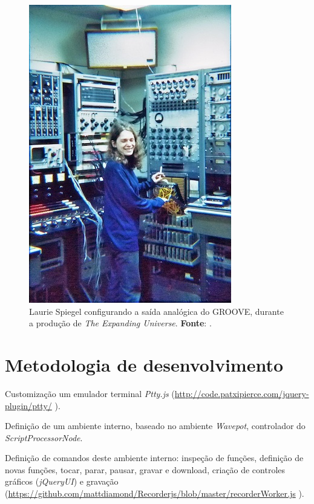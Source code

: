 \begin{figure}[!h]
  \begin{center}
  \includegraphics[scale=0.5]{./spiegel.jpg}
  \caption{\small Laurie Spiegel configurando a saída analógica do GROOVE, durante a produção de \emph{The Expanding Universe}. \textbf{Fonte}: \cite{spiegel_expanding_1975}.}
  \label{fig:groove}
  \end{center}
\end{figure}

\section{Metodologia de desenvolvimento}

\begin{inparaenum}
\item Customização um emulador terminal \emph{Ptty.js} (\footnotesize \url{http://code.patxipierce.com/jquery-plugin/ptty/} \normalsize).
\item Definição de um ambiente interno, baseado no ambiente \emph{Wavepot}, controlador do \emph{ScriptProcessorNode}.
\item Definição de comandos deste ambiente interno: inspeção de funções, definição de novas funções, tocar, parar, pausar, gravar e download, criação de controles gráficos (\emph{jQueryUI}) e gravação (\footnotesize \url{https://github.com/mattdiamond/Recorderjs/blob/master/recorderWorker.js} \normalsize).
\end{inparaenum}

